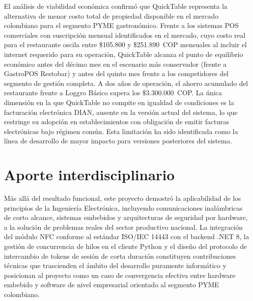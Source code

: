 El análisis de viabilidad económica confirmó que QuickTable representa la alternativa
de menor costo total de propiedad disponible en el mercado colombiano para el segmento
PYME gastronómico. Frente a los sistemas POS comerciales con suscripción mensual
identificados en el mercado, cuyo costo real para el restaurante oscila entre \$105.800
y \$251.890~COP mensuales al incluir el internet requerido para su operación, QuickTable
alcanza el punto de equilibrio económico antes del décimo mes en el escenario más
conservador (frente a GastroPOS Restobar) y antes del quinto mes frente a los
competidores del segmento de gestión completa. A dos años de operación, el ahorro
acumulado del restaurante frente a Loggro Básico supera los \$3.300.000~COP. La única
dimensión en la que QuickTable no compite en igualdad de condiciones es la facturación
electrónica DIAN, ausente en la versión actual del sistema, lo que restringe su adopción
en establecimientos con obligación de emitir facturas electrónicas bajo régimen común.
Esta limitación ha sido identificada como la línea de desarrollo de mayor impacto para
versiones posteriores del sistema.

\section*{Aporte interdisciplinario}

Más allá del resultado funcional, este proyecto demostró la aplicabilidad de los
principios de la Ingeniería Electrónica, incluyendo comunicaciones inalámbricas de corto
alcance, sistemas embebidos y arquitecturas de seguridad por hardware, a la solución de
problemas reales del sector productivo nacional. La integración del módulo NFC conforme
al estándar ISO/IEC 14443 con el backend .NET 8, la gestión de concurrencia de hilos en
el cliente Python y el diseño del protocolo de intercambio de tokens de sesión de corta
duración constituyen contribuciones técnicas que trascienden el ámbito del desarrollo
puramente informático y posicionan al proyecto como un caso de convergencia efectiva
entre hardware embebido y software de nivel empresarial orientado al segmento PYME
colombiano.